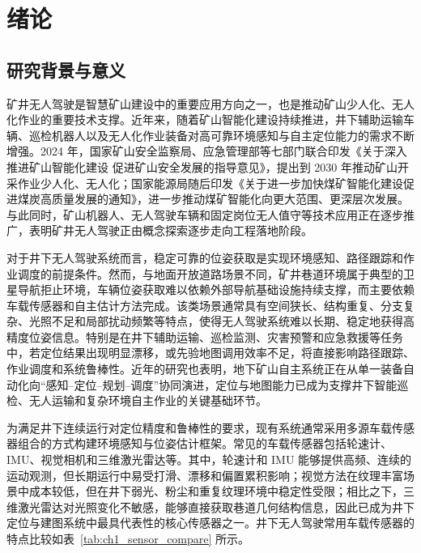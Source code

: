 
\chapter{绪论}

\label{chap:intro}

\section{研究背景与意义}

矿井无人驾驶是智慧矿山建设中的重要应用方向之一，也是推动矿山少人化、无人化作业的重要技术支撑。近年来，随着矿山智能化建设持续推进，井下辅助运输车辆、巡检机器人以及无人化作业装备对高可靠环境感知与自主定位能力的需求不断增强。2024 年，国家矿山安全监察局、应急管理部等七部门联合印发《关于深入推进矿山智能化建设 促进矿山安全发展的指导意见》，提出到 2030 年推动矿山开采作业少人化、无人化\cite{MineIntelligentGuidance2024}；国家能源局随后印发《关于进一步加快煤矿智能化建设促进煤炭高质量发展的通知》，进一步推动煤矿智能化向更大范围、更深层次发展\cite{NEACoalSmart2024}。与此同时，矿山机器人、无人驾驶车辆和固定岗位无人值守等技术应用正在逐步推广\cite{MEMPress20240904,MineRobotScenes2024}，表明矿井无人驾驶正由概念探索逐步走向工程落地阶段。

对于井下无人驾驶系统而言，稳定可靠的位姿获取是实现环境感知、路径跟踪和作业调度的前提条件。然而，与地面开放道路场景不同，矿井巷道环境属于典型的卫星导航拒止环境，车辆位姿获取难以依赖外部导航基础设施持续支撑，而主要依赖车载传感器和自主估计方法完成。该类场景通常具有空间狭长、结构重复、分支复杂、光照不足和局部扰动频繁等特点，使得无人驾驶系统难以长期、稳定地获得高精度位姿信息。特别是在井下辅助运输、巡检监测、灾害预警和应急救援等任务中，若定位结果出现明显漂移，或先验地图调用效率不足，将直接影响路径跟踪、作业调度和系统鲁棒性。近年的研究也表明，地下矿山自主系统正在从单一装备自动化向“感知--定位--规划--调度”协同演进，定位与地图能力已成为支撑井下智能巡检、无人运输和复杂环境自主作业的关键基础环节\cite{Inostroza_2023,Li_2023,Liu_2025}。

为满足井下连续运行对定位精度和鲁棒性的要求，现有系统通常采用多源车载传感器组合的方式构建环境感知与位姿估计框架。常见的车载传感器包括轮速计、IMU、视觉相机和三维激光雷达等。其中，轮速计和 IMU 能够提供高频、连续的运动观测，但长期运行中易受打滑、漂移和偏置累积影响；视觉方法在纹理丰富场景中成本较低，但在井下弱光、粉尘和重复纹理环境中稳定性受限；相比之下，三维激光雷达对光照变化不敏感，能够直接获取巷道几何结构信息，因此已成为井下定位与建图系统中最具代表性的核心传感器之一\cite{Inostroza_2023,Li_2023,Lin_2024}。井下无人驾驶常用车载传感器的特点比较如表~\ref{tab:ch1_sensor_compare} 所示。


